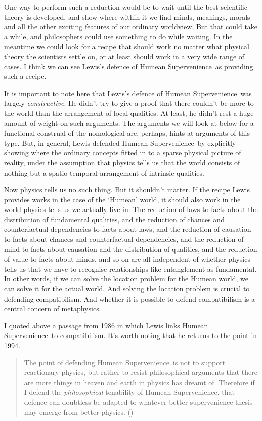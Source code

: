 \documentclass[
  11pt,
  letterpaper,
  DIV=11,
  numbers=noendperiod,
  twoside]{scrartcl}
\begin{document}
One way to perform such a reduction would be to wait until the best
scientific theory is developed, and show where within it we find minds,
meanings, morals and all the other exciting features of our ordinary
worldview. But that could take a while, and philosophers could use
something to do while waiting. In the meantime we could look for a
recipe that should work no matter what physical theory the scientists
settle on, or at least should work in a very wide range of cases. I
think we can see Lewis's defence of Humean Supervenience~as providing
such a recipe.

It is important to note here that Lewis's defence of Humean
Supervenience~was largely \emph{constructive}. He didn't try to give a
proof that there couldn't be more to the world than the arrangement of
local qualities. At least, he didn't rest a huge amount of weight on
such arguments. The arguments we will look at below for a functional
construal of the nomological are, perhaps, hints at arguments of this
type. But, in general, Lewis defended Humean Supervenience~by explicitly
showing where the ordinary concepts fitted in to a sparse physical
picture of reality, under the assumption that physics tells us that the
world consists of nothing but a spatio-temporal arrangement of intrinsic
qualities.

Now physics tells us no such thing. But it shouldn't matter. If the
recipe Lewis provides works in the case of the `Humean' world, it should
also work in the world physics tells us we actually live in. The
reduction of laws to facts about the distribution of fundamental
qualities, and the reduction of chances and counterfactual dependencies
to facts about laws, and the reduction of causation to facts about
chances and counterfactual dependencies, and the reduction of mind to
facts about causation and the distribution of qualities, and the
reduction of value to facts about minds, and so on are all independent
of whether physics tells us that we have to recognise relationships like
entanglement as fundamental. In other words, if we can solve the
location problem for the Humean world, we can solve it for the actual
world. And solving the location problem is crucial to defending
compatibilism. And whether it is possible to defend compatibilism is a
central concern of metaphysics.

I quoted above a passage from 1986 in which Lewis links Humean
Supervenience~to compatibilism. It's worth noting that he returns to the
point in 1994.

\begin{quote}
The point of defending Humean Supervenience~is not to support
reactionary physics, but rather to resist philosophical arguments that
there are more things in heaven and earth in physics has dreamt of.
Therefore if I defend the \emph{philosophical} tenability of Humean
Supervenience, that defence can doubtless be adapted to whatever better
supervenience thesis may emerge from better physics.
()
\end{quote}
\end{document}
